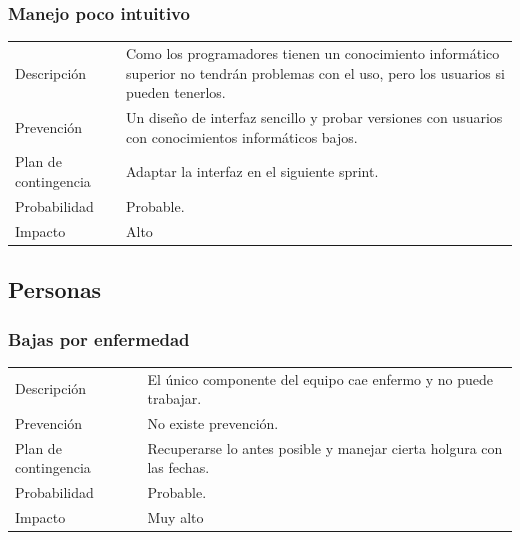 \subsubsection{Manejo poco intuitivo}
\begin{table}[H]
    \begin{center}
        \begin{tabular}{l p{8cm}}
            Descripci\'{o}n                 & Como  los  programadores  tienen  un  conocimiento
            inform\'{a}tico superior no tendr\'{a}n problemas con el uso, pero los usuarios si pueden tenerlos.\\
            Prevenci\'{o}n                  & Un diseño de interfaz sencillo y probar versiones con
            usuarios con conocimientos inform\'{a}ticos bajos. \\ 
            Plan de contingencia            & Adaptar la interfaz en el siguiente sprint. \\
            Probabilidad                    & Probable. \\
            Impacto                         & Alto \\
        \end{tabular}
    \end{center}
    
\end{table}

\subsection{Personas}
\subsubsection{Bajas por enfermedad}
\begin{table}[H]
    \begin{center}
        \begin{tabular}{l p{8cm}}
            Descripci\'{o}n                 & El \'{u}nico componente del equipo cae enfermo y no puede trabajar. \\
            Prevenci\'{o}n                  & No existe prevenci\'{o}n. \\ 
            Plan de contingencia            & Recuperarse lo antes posible y manejar cierta holgura con las fechas.\\
            Probabilidad                    & Probable. \\
            Impacto                         & Muy alto \\
        \end{tabular}
    \end{center}
    
\end{table}

